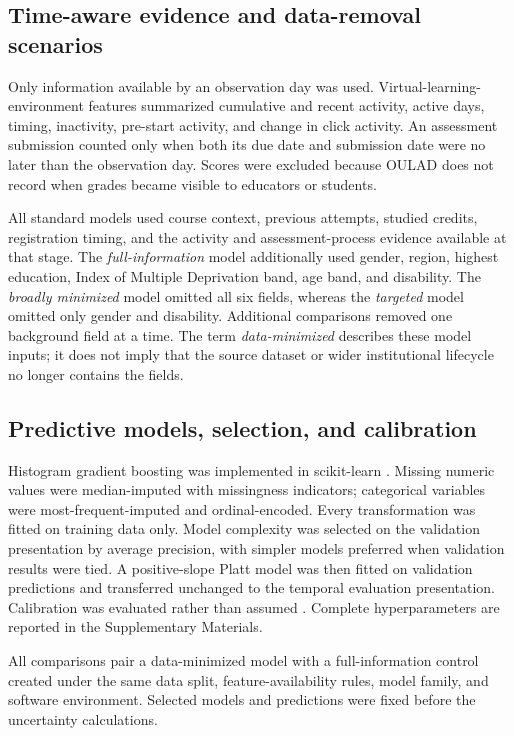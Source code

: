 \documentclass[education,article,submit,moreauthors]{Definitions/mdpi}
\begin{document}
\subsection{Time-aware evidence and data-removal scenarios}

Only information available by an observation day was used. Virtual-learning-environment features summarized cumulative and recent activity, active days, timing, inactivity, pre-start activity, and change in click activity. An assessment submission counted only when both its due date and submission date were no later than the observation day. Scores were excluded because OULAD does not record when grades became visible to educators or students.

All standard models used course context, previous attempts, studied credits, registration timing, and the activity and assessment-process evidence available at that stage. The \emph{full-information} model additionally used gender, region, highest education, Index of Multiple Deprivation band, age band, and disability. The \emph{broadly minimized} model omitted all six fields, whereas the \emph{targeted} model omitted only gender and disability. Additional comparisons removed one background field at a time. The term \emph{data-minimized} describes these model inputs; it does not imply that the source dataset or wider institutional lifecycle no longer contains the fields.

\subsection{Predictive models, selection, and calibration}

Histogram gradient boosting was implemented in scikit-learn \citep{pedregosa2011scikit}. Missing numeric values were median-imputed with missingness indicators; categorical variables were most-frequent-imputed and ordinal-encoded. Every transformation was fitted on training data only. Model complexity was selected on the validation presentation by average precision, with simpler models preferred when validation results were tied. A positive-slope Platt model was then fitted on validation predictions and transferred unchanged to the temporal evaluation presentation. Calibration was evaluated rather than assumed \citep{vancalster2019calibration,collins2024tripod,moons2025probast}. Complete hyperparameters are reported in the Supplementary Materials.

All comparisons pair a data-minimized model with a full-information control created under the same data split, feature-availability rules, model family, and software environment. Selected models and predictions were fixed before the uncertainty calculations.
\end{document}
